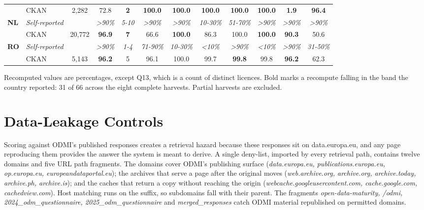 {\begin{longtable}[]{@{}llcccccccccc@{}}
& CKAN & 2,282 & 72.8 & \textbf{2} & \textbf{100.0} & \textbf{100.0} & \textbf{100.0} & \textbf{100.0} & \textbf{100.0} & \textbf{1.9} & \textbf{96.4} \\
\textbf{NL} & \emph{Self-reported} & & \emph{\textgreater90\%} & \emph{5-10} & \emph{\textgreater90\%} & \emph{\textgreater90\%} & \emph{10-30\%} & \emph{51-70\%} & \emph{\textgreater90\%} & \emph{\textgreater90\%} & \emph{\textgreater90\%} \\
& CKAN & 20,772 & \textbf{96.9} & \textbf{7} & 66.6 & \textbf{100.0} & 86.3 & 100.0 & \textbf{100.0} & \textbf{90.3} & 50.6 \\
\textbf{RO} & \emph{Self-reported} & & \emph{\textgreater90\%} & \emph{1-4} & \emph{71-90\%} & \emph{10-30\%} & \emph{\textless10\%} & \emph{\textgreater90\%} & \emph{\textless10\%} & \emph{\textgreater90\%} & \emph{31-50\%} \\
& CKAN & 5,143 & \textbf{96.2} & 5 & 96.1 & 100.0 & 99.7 & \textbf{99.8} & 99.8 & \textbf{96.2} & 62.3 \\
\end{longtable}
}

Recomputed values are percentages, except Q13, which is a count of distinct licences. Bold marks a recompute falling in the band the country reported: 31 of 66 across the eight complete harvests. Partial harvests are excluded. 

\section{Data-Leakage Controls}\label{sec:leakage-controls}

Scoring against ODMI's published responses creates a retrieval hazard because these responses sit on data.europa.eu, and any page reproducing them provides the answer the system is meant to derive. A single deny-list, imported by every retrieval path, contains twelve domains and five URL path fragments. The domains cover ODMI's publishing surface (\emph{data.europa.eu, publications.europa.eu, op.europa.eu, europeandataportal.eu}); the archives that serve a page after the original moves (\emph{web.archive.org, archive.org, archive.today, archive.ph, archive.is}); and the caches that return a copy without reaching the origin (\emph{webcache.googleusercontent.com, cache.google.com, cachedview.com}). Host matching runs on the suffix, so subdomains fall with their parent. The fragments \emph{open-data-maturity, /odmi, 2024\_odm\_questionnaire, 2025\_odm\_questionnaire} and \emph{merged\_responses} catch ODMI material republished on permitted domains.



